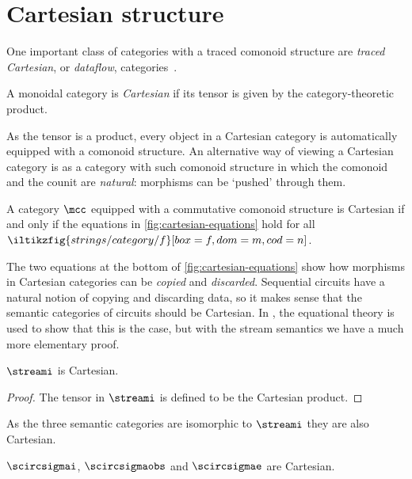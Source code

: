 \section{Cartesian structure}

One important class of categories with a traced comonoid structure are
\emph{traced Cartesian}, or \emph{dataflow},
categories~\cite{cazanescu1990new}.

\begin{definition}
    A monoidal category is \emph{Cartesian} if its tensor is given by the
    category-theoretic product.
\end{definition}

As the tensor is a product, every object in a Cartesian category is
automatically equipped with a comonoid structure.
An alternative way of viewing a Cartesian category is as a category with such
comonoid structure in which the comonoid and the counit are \emph{natural}:
morphisms can be `pushed' through them.

\begin{theorem}
    A category \(\mcc\) equipped with a commutative comonoid structure is
    Cartesian if and only if the equations in \cref{fig:cartesian-equations}
    hold for all \(\iltikzfig{strings/category/f}[box=f,dom=m,cod=n]\).
\end{theorem}



The two equations at the bottom of \cref{fig:cartesian-equations} show how
morphisms in Cartesian categories can be \emph{copied} and \emph{discarded}.
Sequential circuits have a natural notion of copying and discarding data, so it
makes sense that the semantic categories of circuits should be Cartesian.
In \cite{ghica2016categorical}, the equational theory is used to show that this
is the case, but with the stream semantics we have a much more elementary proof.

\begin{theorem}
    \(\streami\) is Cartesian.
\end{theorem}
\begin{proof}
    The tensor in \(\streami\) is defined to be the Cartesian product.
\end{proof}

As the three semantic categories are isomorphic to \(\streami\) they are also
Cartesian.

\begin{corollary}
    \(\scircsigmai\), \(\scircsigmaobs\) and \(\scircsigmae\) are Cartesian.
\end{corollary}

